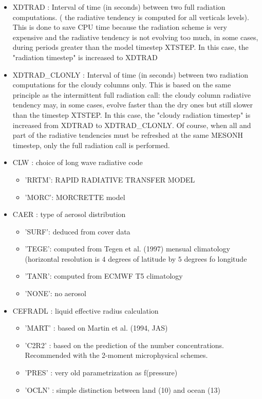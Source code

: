 \begin{itemize}
\item
{}
XDTRAD  : Interval of time (in seconds) between two full radiation
           computations. ( the radiative tendency is computed for all  
           verticals levels). This is done  to save
CPU time because the radiation scheme is very expensive and the radiative 
tendency is not evolving too much, in some cases, during periods greater than 
the model timestep XTSTEP. In this case, the "radiation timestep" is increased
to XDTRAD

\item
{}
XDTRAD\_CLONLY : Interval of time (in seconds) between two radiation
 computations for the cloudy columns only. This is based on the same principle
as the intermittent full radiation call: the cloudy column radiative tendency
may, in some cases, evolve faster than the dry ones but still slower than the
timestep XTSTEP. In this case, the "cloudy radiation timestep" is increased
from XDTRAD to XDTRAD\_CLONLY. Of course, when all and part of the radiative tendencies must
be refreshed at the same MESONH timestep, only the full radiation call is
performed. 

\item
{}
CLW :  choice of long wave radiative code
\begin{itemize}
\item 'RRTM': RAPID RADIATIVE TRANSFER MODEL
\item 'MORC': MORCRETTE model
\end{itemize}

\item
{}
CAER :  type of aerosol distribution
\begin{itemize}
\item 'SURF': deduced from cover data
\item 'TEGE': computed from Tegen et al. (1997) mensual climatology
(horizontal resolution is $4$ degrees of latitude by $5$ degrees fo longitude
\item 'TANR': computed from ECMWF T5 climatology
\item 'NONE': no aerosol
\end{itemize}

\item
{}
CEFRADL :  liquid effective radius calculation
\begin{itemize}
\item 'MART' : based on Martin et al. (1994, JAS)
\item 'C2R2' : based on the prediction of the number concentrations.
Recommended with the 2-moment microphysical schemes.
\item 'PRES' : very old parametrization as f(pressure)
\item 'OCLN' : simple distinction between land (10) and ocean (13)
\end{itemize}


\end{itemize}
